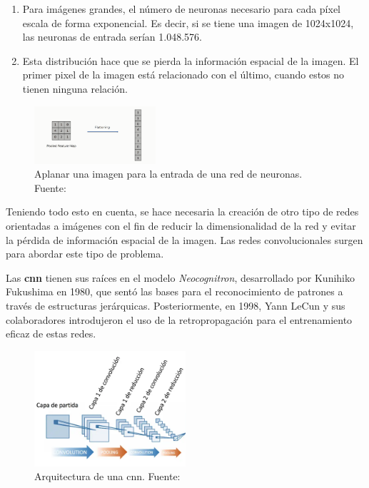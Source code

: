 \begin{enumerate}
	\item Para imágenes grandes, el número de neuronas necesario para cada píxel escala de forma exponencial. Es decir, si se tiene una imagen de 1024x1024, las neuronas de entrada serían 1.048.576.
	\item Esta distribución hace que se pierda la información espacial de la imagen. El primer pixel de la imagen está relacionado con el último, cuando estos no tienen ninguna relación.
\end{enumerate}

\begin{figure}[H]
	\centering
	\includegraphics[width=0.4\textwidth]{figures/flatten.png}
	\caption{\label{fig:flatten}Aplanar una imagen para la entrada de una red de neuronas. Fuente: \cite{flatten}}
\end{figure}

Teniendo todo esto en cuenta, se hace necesaria la creación de otro tipo de redes orientadas a imágenes con el fin de reducir la dimensionalidad de la red y evitar la pérdida de información espacial de la imagen. Las redes convolucionales surgen para abordar este tipo de problema.

Las \textbf{\gls{cnn}} tienen sus raíces en el modelo \textit{Neocognitron}, desarrollado por Kunihiko Fukushima en 1980, que sentó las bases para el reconocimiento de patrones a través de estructuras jerárquicas\cite{neocognitron}. Posteriormente, en 1998, Yann LeCun y sus colaboradores introdujeron el uso de la retropropagación para el entrenamiento eficaz de estas redes\cite{LeCun1998}.

\begin{figure}[H]
	\centering
	\includegraphics[width=0.5\textwidth]{figures/red-neuronal-convolucional-arquitectura.jpg}
	\caption{\label{fig:cnnarq}Arquitectura de una \acrfull{cnn}. Fuente: \cite{Calvo}}
\end{figure}

